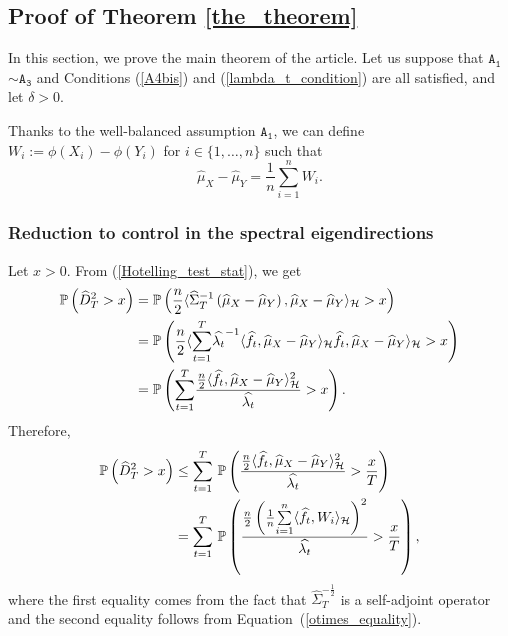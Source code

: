 \documentclass[twoside,11pt]{article}
\newcommand{\Hk}{\mathcal{H}}
\newcommand{\nb}{n}
\newcommand{\PPO}{\mathbb{P} }
\newcommand{\A}[1]{$\mathtt{A_#1}$}
\begin{document}
\subsection{Proof of Theorem \ref{the_theorem}}
In this section, we prove the main theorem of the article. 
Let us suppose that \A{1}$\sim$\A{3} and Conditions (\ref{A4bis}) and (\ref{lambda_t_condition}) are all satisfied, and let $\delta>0$. 

Thanks to the well-balanced assumption \A{1}, we can define $W_i := \phi(X_i) - \phi(Y_i)$ for $i \in \{1,\ldots,\nb\}$ such that 
    $$ \widehat{\mu}_X - \widehat{\mu}_Y = \frac{1}{\nb} \underset{i=1}{\overset{\nb}{\sum}} W_i.$$
\subsubsection*{Reduction to control in the spectral eigendirections}   
Let $x >0$. From (\ref{Hotelling_test_stat}), we get 
    \begin{align}
    \PPO \left(\widehat{D}^2_T > x \right) &= \PPO \left(\frac{\nb}{2} \langle \widehat{\Sigma}_T^{-1} \left(\widehat{\mu}_X - \widehat{\mu}_Y\right), \widehat{\mu}_X - \widehat{\mu}_Y  \rangle_{\Hk}> x \right) \notag \\
    &=  \PPO \left( \frac{\nb}{2} \langle \underset{t=1}{\overset{T}{\sum}} \widehat{\lambda_t}^{-1} \langle \widehat{f}_t , \widehat{\mu}_X - \widehat{\mu}_Y \rangle_{\Hk}  \widehat{f}_t , \widehat{\mu}_X - \widehat{\mu}_Y  \rangle_{\Hk}> x \right) \notag \\    
    &= \PPO \left( \underset{t=1}{\overset{T}{\sum}} \frac{ \frac{\nb}{2} \langle \widehat{f}_t ,\widehat{\mu}_X - \widehat{\mu}_Y \rangle_{\Hk}^2}{\widehat{\lambda_t}}  > x \right). \notag 
    \end{align}
Therefore,
\begin{align}
 \PPO \left(\widehat{D}^2_T > x \right)    &\leq \underset{t=1}{\overset{T}{\sum}} \ \PPO \left( \frac{\frac{\nb}{2}\langle \widehat{f}_t ,\widehat{\mu}_X - \widehat{\mu}_Y \rangle_{\Hk}^2}{\widehat{\lambda_t}}  > \frac{x}{T} \right) \notag \\   
    &= \underset{t=1}{\overset{T}{\sum}} \ \PPO \left( \frac{ \frac{\nb}{2} \left(  \frac{1}{\nb} \underset{i=1}{\overset{\nb}{\sum}} \langle \widehat{f}_t , W_i \rangle_{\Hk} \right)^2}{\widehat{\lambda_t}}  > \frac{x}{T} \right),
    \label{until_Hoeffding}
\end{align}
where the first equality comes from the fact that $\widehat{\Sigma}_T^{-\frac{1}{2}}$ is a self-adjoint operator and the second equality follows from Equation~(\ref{otimes_equality}).
\end{document}
